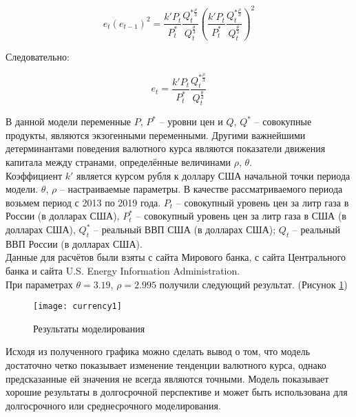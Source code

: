 \[e_t (e_{t-1})^2 = \dfrac{k' P_t}{P^*_t} \dfrac{Q_t^{*\frac{\rho}{3}}}{Q_t^{\frac{\theta}{3}}} \left( \dfrac{k' P_t}{P^*_t} \dfrac{Q_t^{*\frac{\rho}{3}}}{Q_t^{\frac{\theta}{3}}} \right)^2 \]

Следовательно:

\[ e_t = \dfrac{k' P_t}{P^*_t} \dfrac{Q_t^{*\frac{\rho}{3}}}{Q_t^{\frac{\theta}{3}}} \]

В данной модели переменные $P$, $P^*$ -- уровни цен и $Q$, $Q^*$ -- совокупные продукты, являются экзогенными переменными. Другими важнейшими детерминантами поведения валютного курса являются показатели движения капитала между странами, определённые величинами $\rho$, $\theta$.\\

Коэффициент $k'$ является курсом рубля к доллару США начальной точки периода модели. $\theta$, $\rho$ -- настраиваемые параметры. В качестве рассматриваемого периода возьмем период с 2013 по 2019 года. $P_t$ -- совокупный уровень цен за литр газа в России (в долларах США), $P_t^*$ -- совокупный уровень цен за литр газа в США (в долларах США),  $Q_t^*$ -- реальный ВВП США (в долларах США); $Q_t$ -- реальный ВВП России (в долларах США).\\

Данные для расчётов были взяты с сайта Мирового банка, с сайта Центрального банка и сайта U.S. Energy Information Administration.\\

При параметрах $\theta = 3.19$, $\rho = 2.995$ получили следующий результат. (Рисунок \ref{fig:currency1})
\begin{figure}[h]
	\centering \texttt{[image: currency1]}
	\caption{Результаты моделирования}
	\label{fig:currency1}
\end{figure}

\newpage

Исходя из полученного графика можно сделать вывод о том, что модель достаточно четко показывает изменение тенденции валютного курса, однако предсказанные ей значения не всегда являются точными. Модель показывает хорошие результаты в долгосрочной перспективе и может быть использована для долгосрочного или среднесрочного моделирования.